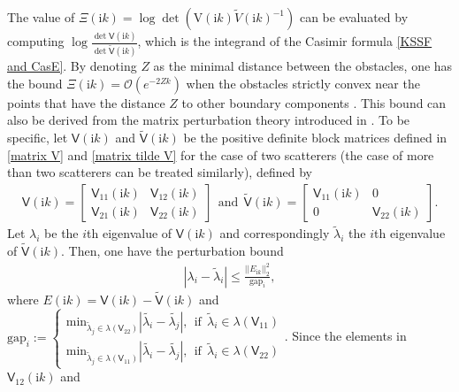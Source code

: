 The value of $\Xi(\mathrm{i}k) = \log\det(\mathrm{V}(\mathrm{i}k)\tilde{V}(\mathrm{i}k)^{-1})$ can be evaluated by computing 
$\log\frac{\det\mathsf{V}(\mathrm{i}k)}{\det\tilde{\mathsf{V}}(\mathrm{i}k)}$, which is the integrand of the Casimir formula \eqref{KSSF and CasE}. 
By denoting $Z$ as the minimal distance between the obstacles, 
one has the bound $\Xi(\mathrm{i}k) = \mathcal{O}(e^{-2Zk})$ when the obstacles strictly convex near the points that have the distance $Z$ to other 
boundary components \cite[Theorem 4.1]{fang2022trace}. This bound can also be derived from the matrix perturbation theory introduced in \cite{nakatsukasa2015off}. 
To be specific, let $\mathsf{V}(\mathrm{i}k)$ and $\tilde{\mathsf{V}}(\mathrm{i}k)$ be the positive definite block matrices defined in \eqref{matrix V} and \eqref{matrix tilde V} 
for the case of two scatterers (the case of more than two scatterers can be treated similarly), defined by
\begin{align*}
    \mathsf{V}(\mathrm{i}k) = \begin{bmatrix}
        \mathsf{V}_{11}(\mathrm{i}k) & \mathsf{V}_{12}(\mathrm{i}k)\\
        \mathsf{V}_{21}(\mathrm{i}k) & \mathsf{V}_{22}(\mathrm{i}k)
    \end{bmatrix} \ \ \text{and} \ \   \tilde{\mathsf{V}}(\mathrm{i}k) = \begin{bmatrix}
        \mathsf{V}_{11}(\mathrm{i}k) & 0\\
        0 & \mathsf{V}_{22}(\mathrm{i}k)
    \end{bmatrix}.
\end{align*}
Let $\lambda_i$ be the $i$th eigenvalue of $\mathsf{V}(\mathrm{i}k)$ and correspondingly $\tilde{\lambda}_i$ the $i$th eigenvalue of $\tilde{\mathsf{V}}(\mathrm{i}k)$.
Then, one have the perturbation bound \cite[Theorem 4.1]{fang2022trace}
\begin{align}\label{gap}
    |\lambda_{i} - \tilde{\lambda}_{i}| \leq \frac{||E_{\mathrm{i}k}||_{2}^{2}}{\text{gap}_{i}}, 
\end{align}
where $E(\mathrm{i}k) = \mathsf{V}(\mathrm{i}k) - \tilde{\mathsf{V}}(\mathrm{i}k)$ and $\text{gap}_{i}:= \begin{cases}
    \text{min}_{\tilde{\lambda}_{j}\in\lambda(\mathsf{V}_{22})}|\tilde{\lambda_{i}} - \tilde{\lambda_{j}}|, \ \ \text{if}\ \ \tilde{\lambda}_{i} \in \lambda(\mathsf{V}_{11})\\
    \text{min}_{\tilde{\lambda}_{j}\in\lambda(\mathsf{V}_{11})}|\tilde{\lambda_{i}} - \tilde{\lambda_{j}}|, \ \ \text{if}\ \  \tilde{\lambda}_{i} \in \lambda(\mathsf{V}_{22})
\end{cases}$. Since the elements in $\mathsf{V}_{12}(\mathrm{i}k)$ and 
